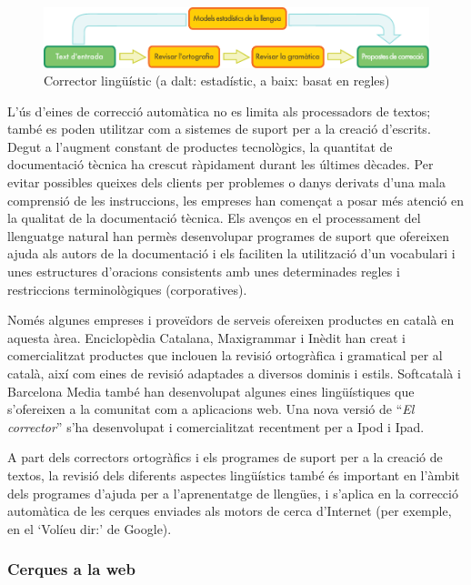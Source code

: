 \begin{multicols}{2}
\begin{figure}[htb]
  \vspace{-9mm}
  \center
  \includegraphics[width=\textwidth]{../_media/catalan/language_checking}
  \caption{Corrector lingüístic (a dalt: estadístic, a baix: basat en regles)}
  \label{fig:langcheckingaarch_ca}
\end{figure}

L’ús d’eines de correcció automàtica no es limita als processadors de textos; també es poden utilitzar com a sistemes de suport per a la creació d’escrits. Degut a l’augment constant de productes tecnològics, la quantitat de documentació tècnica ha crescut ràpidament durant les últimes dècades. Per evitar possibles queixes dels clients per problemes o danys derivats d’una mala comprensió de les instruccions, les empreses han començat a posar més atenció en la qualitat de la documentació tècnica. Els avenços en el processament del llenguatge natural han permès desenvolupar programes de suport que ofereixen ajuda als autors de la documentació i els faciliten la utilització d’un vocabulari i unes estructures d’oracions consistents amb unes determinades regles i restriccions terminològiques (corporatives).

Només algunes empreses i proveïdors de serveis ofereixen productes en català en aquesta àrea. Enciclopèdia Catalana, Maxigrammar i Inèdit han creat i comercialitzat productes que inclouen la revisió ortogràfica i gramatical per al català, així com eines de revisió adaptades a diversos dominis i estils. Softcatalà i Barcelona Media també han desenvolupat algunes eines lingüístiques que s’ofereixen a la comunitat com a aplicacions web. Una nova versió de “\textit{El corrector}” s’ha desenvolupat i comercialitzat recentment per a Ipod i Ipad. 

A part dels correctors ortogràfics i els programes de suport per a la creació de textos, la revisió dels diferents aspectes lingüístics també és important en l’àmbit dels programes d’ajuda per a l’aprenentatge de llengües, i s’aplica en la correcció automàtica de les cerques enviades als motors de cerca d’Internet (per exemple, en el ‘Volíeu dir:’ de Google). 

\subsubsection{Cerques a la web}


\end{multicols}

